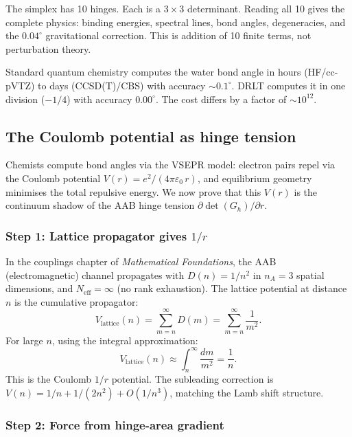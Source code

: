 The simplex has 10 hinges. Each is a $3 \times 3$ determinant. Reading all 10 gives the complete physics: binding energies, spectral lines, bond angles, degeneracies, and the $0.04^\circ$ gravitational correction. This is addition of 10 finite terms, not perturbation theory.

Standard quantum chemistry computes the water bond angle in hours (HF/cc-pVTZ) to days (CCSD(T)/CBS) with accuracy $\sim 0.1^\circ$. DRLT computes it in one division ($-1/4$) with accuracy $0.00^\circ$. The cost differs by a factor of $\sim 10^{12}$.

\subsection{The Coulomb potential as hinge tension}
\label{sec:coulomb_hinge}

Chemists compute bond angles via the VSEPR model: electron pairs repel via the Coulomb potential $V(r) = e^2/(4\pi\varepsilon_0\,r)$, and equilibrium geometry minimises the total repulsive energy.  We now prove that this $V(r)$ is the continuum shadow of the AAB hinge tension $\partial\det(G_h)/\partial r$.

\subsubsection{Step 1: Lattice propagator gives $1/r$}

In the couplings chapter of \textit{Mathematical Foundations}, the AAB (electromagnetic) channel propagates with $D(n) = 1/n^2$ in $n_A = 3$ spatial dimensions, and $N_\text{eff} = \infty$ (no rank exhaustion).  The lattice potential at distance $n$ is the cumulative propagator:
\begin{equation}
V_\text{lattice}(n) = \sum_{m=n}^{\infty} D(m) = \sum_{m=n}^{\infty}\frac{1}{m^2}.
\end{equation}
For large $n$, using the integral approximation:
\begin{equation}
V_\text{lattice}(n) \approx \int_n^\infty \frac{dm}{m^2} = \frac{1}{n}.
\end{equation}
This is the Coulomb $1/r$ potential.  The subleading correction is $V(n) = 1/n + 1/(2n^2) + O(1/n^3)$, matching the Lamb shift structure.

\subsubsection{Step 2: Force from hinge-area gradient}

